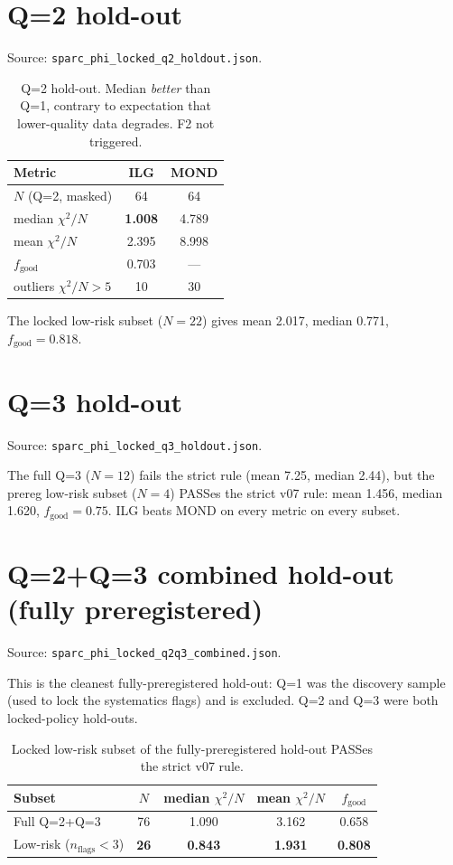 \documentclass[11pt,a4paper]{article}
\newcommand{\chiN}{\ensuremath{\chi^{2}/N}}
\theoremstyle{plain}
\theoremstyle{definition}
\begin{document}
\section{Q=2 hold-out}
Source: \texttt{sparc\_phi\_locked\_q2\_holdout.json}.

\begin{table}[h]
\centering\small
\begin{tabular}{lcc}
\toprule
Metric & ILG & MOND \\
\midrule
$N$ (Q=2, masked) & 64 & 64 \\
median $\chiN$ & \textbf{1.008} & 4.789 \\
mean $\chiN$ & 2.395 & 8.998 \\
$f_{\mathrm{good}}$ & 0.703 & --- \\
outliers $\chiN > 5$ & 10 & 30 \\
\bottomrule
\end{tabular}
\caption{Q=2 hold-out. Median \emph{better} than Q=1, contrary to expectation that lower-quality data degrades. F2 not triggered.}
\end{table}

The locked low-risk subset ($N=22$) gives mean 2.017, median 0.771, $f_{\mathrm{good}} = 0.818$.

\section{Q=3 hold-out}
Source: \texttt{sparc\_phi\_locked\_q3\_holdout.json}.

The full Q=3 ($N=12$) fails the strict rule (mean 7.25, median 2.44), but the prereg low-risk subset ($N=4$) PASSes the strict v07 rule: mean 1.456, median 1.620, $f_{\mathrm{good}} = 0.75$. ILG beats MOND on every metric on every subset.

\section{Q=2+Q=3 combined hold-out (fully preregistered)}
Source: \texttt{sparc\_phi\_locked\_q2q3\_combined.json}.

This is the cleanest fully-preregistered hold-out: Q=1 was the discovery sample (used to lock the systematics flags) and is excluded. Q=2 and Q=3 were both locked-policy hold-outs.

\begin{table}[h]
\centering\small
\begin{tabular}{lcccc}
\toprule
Subset & $N$ & median $\chiN$ & mean $\chiN$ & $f_{\mathrm{good}}$ \\
\midrule
Full Q=2+Q=3 & 76 & 1.090 & 3.162 & 0.658 \\
Low-risk ($n_{\mathrm{flags}}<3$) & \textbf{26} & \textbf{0.843} & \textbf{1.931} & \textbf{0.808} \\
\bottomrule
\end{tabular}
\caption{Locked low-risk subset of the fully-preregistered hold-out PASSes the strict v07 rule.}
\end{table}
\end{document}
